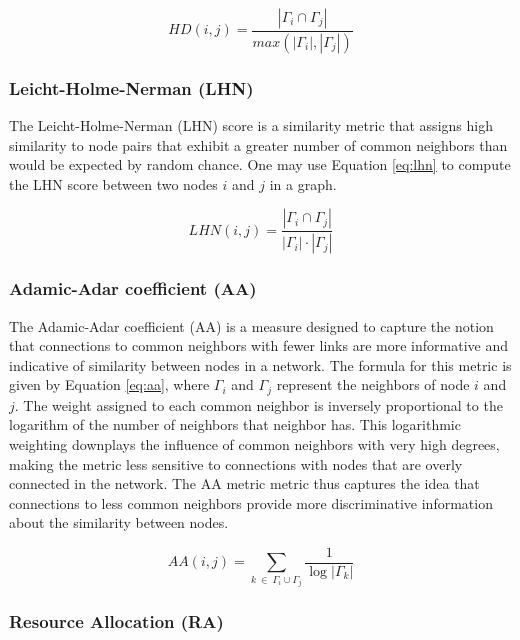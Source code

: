 \begin{equation}
\label{eq:hd}
  HD(i, j) = \frac{|\Gamma_i \cap \Gamma_j|}{max(|\Gamma_i|, |\Gamma_j|)}
\end{equation}


\subsubsection{Leicht-Holme-Nerman (LHN)}

The Leicht-Holme-Nerman (LHN) score \cite{leicht2006vertex} is a similarity metric that assigns high similarity to node pairs that exhibit a greater number of common neighbors than would be expected by random chance. One may use Equation \ref{eq:lhn} to compute the LHN score between two nodes $i$ and $j$ in a graph.

\begin{equation}
\label{eq:lhn}
  LHN(i, j) = \frac{|\Gamma_i \cap \Gamma_j|}{|\Gamma_i| \cdot |\Gamma_j|}
\end{equation}


\subsubsection{Adamic-Adar coefficient (AA)}

The Adamic-Adar coefficient (AA) \cite{adamic2003friends} is a measure designed to capture the notion that connections to common neighbors with fewer links are more informative and indicative of similarity between nodes in a network. The formula for this metric is given by Equation \ref{eq:aa}, where $\Gamma_i$ and $\Gamma_j$ represent the neighbors of node $i$ and $j$. The weight assigned to each common neighbor is inversely proportional to the logarithm of the number of neighbors that neighbor has. This logarithmic weighting downplays the influence of common neighbors with very high degrees, making the metric less sensitive to connections with nodes that are overly connected in the network. The AA metric metric thus captures the idea that connections to less common neighbors provide more discriminative information about the similarity between nodes.

\begin{equation}
\label{eq:aa}
  AA(i, j) = \sum_{k\ \in\ \Gamma_i \cup \Gamma_j} \frac{1}{\log{|\Gamma_k|}}
\end{equation}


\subsubsection{Resource Allocation (RA)}

